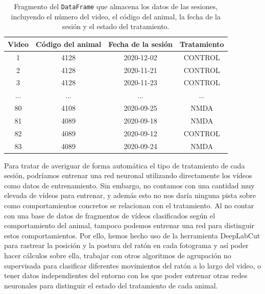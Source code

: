 \begin{table}[h]
  \centering
  \begin{tabular}{|c|c|c|c|}
    \hline
    \textbf{Video} & \textbf{Código del animal} & \textbf{Fecha de la sesión} & \textbf{Tratamiento} \\ 
    \hline
    1 & 4128	& 2020-12-02	& CONTROL \\ 	
    2 & 4128	& 2020-11-21	& CONTROL \\ 	
    3 & 4128	& 2020-11-23	& CONTROL \\ 
    ... &  ...	& ... & ... \\ 
    80 & 4108	& 2020-09-25	& NMDA	\\ 
    81 & 4089	& 2020-09-18	& NMDA	\\
    82 & 4089	& 2020-09-12	& CONTROL	\\ 
    83 & 4089	& 2020-09-24	& NMDA	\\
    \hline
  \end{tabular}
  \caption[Datos de las sesiones]{Fragmento del \texttt{DataFrame} que almacena los datos de las sesiones, incluyendo el número del video, el código del animal, la fecha de la sesión y el estado del tratamiento.}
  \label{tab:animal-info}
\end{table}

Para tratar de averiguar de forma automática el tipo de tratamiento de cada sesión, podríamos entrenar una red neuronal utilizando directamente los vídeos como datos de entrenamiento. Sin embargo, no contamos con una cantidad muy elevada de vídeos para entrenar, y además esto no nos daría ninguna pista sobre como comportamientos concretos se relacionan con el tratamiento. Al no contar con una base de datos de fragmentos de vídeos clasificados según el comportamiento del animal, tampoco podemos entrenar una red para distinguir estos comportamientos. Por ello, hemos hecho uso de la herramienta DeepLabCut para rastrear la posición y la postura del ratón en cada fotograma y así poder hacer cálculos sobre ella, trabajar con otros algoritmos de agrupación no supervisada para  clasificar diferentes movimientos del ratón a lo largo del video, o tener datos independientes del entorno con los que poder entrenar otras redes neuronales para distinguir el estado del tratamiento de cada animal.


